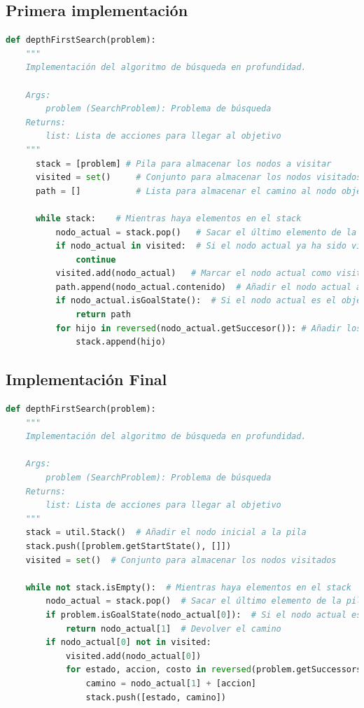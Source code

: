\documentclass{report}
\begin{document}
        \subsection*{Primera implementación}
          \begin{lstlisting}[language=Python, caption=Implementación inicial del DFS]
  def depthFirstSearch(problem):
    """
    Implementación del algoritmo de búsqueda en profundidad.

    Args:
        problem (SearchProblem): Problema de búsqueda
    Returns:
        list: Lista de acciones para llegar al objetivo
    """
      stack = [problem] # Pila para almacenar los nodos a visitar
      visited = set()     # Conjunto para almacenar los nodos visitados
      path = []           # Lista para almacenar el camino al nodo objetivo

      while stack:    # Mientras haya elementos en el stack
          nodo_actual = stack.pop()   # Sacar el último elemento de la pila
          if nodo_actual in visited:  # Si el nodo actual ya ha sido visitado
              continue
          visited.add(nodo_actual)   # Marcar el nodo actual como visitado
          path.append(nodo_actual.contenido)  # Añadir el nodo actual al camino
          if nodo_actual.isGoalState():  # Si el nodo actual es el objetivo
              return path
          for hijo in reversed(nodo_actual.getSuccesor()): # Añadir los hijos del nodo actual a la pila
              stack.append(hijo)
          \end{lstlisting}
        \clearpage\subsection*{Implementación Final}
          \begin{lstlisting}[language=Python, caption=Implementación final del DFS]
  def depthFirstSearch(problem):
    """
    Implementación del algoritmo de búsqueda en profundidad.

    Args:
        problem (SearchProblem): Problema de búsqueda
    Returns:
        list: Lista de acciones para llegar al objetivo
    """
    stack = util.Stack()  # Añadir el nodo inicial a la pila
    stack.push([problem.getStartState(), []])
    visited = set()  # Conjunto para almacenar los nodos visitados

    while not stack.isEmpty():  # Mientras haya elementos en el stack
        nodo_actual = stack.pop()  # Sacar el último elemento de la pila
        if problem.isGoalState(nodo_actual[0]):  # Si el nodo actual es el objetivo
            return nodo_actual[1]  # Devolver el camino
        if nodo_actual[0] not in visited:
            visited.add(nodo_actual[0])
            for estado, accion, costo in reversed(problem.getSuccessors(nodo_actual[0])): 
                camino = nodo_actual[1] + [accion]
                stack.push([estado, camino])
          \end{lstlisting}
\end{document}
